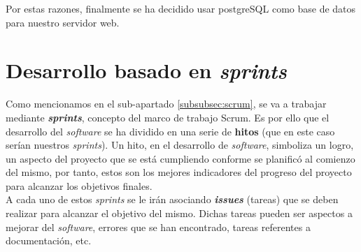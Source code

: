     Por estas razones, finalmente se ha decidido usar postgreSQL como base de datos para
    nuestro servidor web.

\section{Desarrollo basado en \textit{sprints}} \label{sec:sprints}
Como mencionamos en el sub-apartado \ref{subsubsec:scrum}, se va a trabajar mediante
\textbf{\textit{sprints}}, concepto del marco de trabajo Scrum. Es por ello que el desarrollo del
\textit{software} se ha dividido en una serie de \textbf{hitos} (que en este caso serían
nuestros \textit{sprints}). Un hito, en el desarrollo de \textit{software}, simboliza un
logro, un aspecto del proyecto que se está cumpliendo conforme se planificó al comienzo del
mismo, por tanto, estos son los mejores indicadores del progreso del proyecto para alcanzar
los objetivos finales.\\

A cada uno de estos \textit{sprints} se le irán asociando \textbf{\textit{issues}} (tareas)
que se deben realizar para alcanzar el objetivo del mismo. Dichas tareas pueden ser aspectos
a mejorar del \textit{software}, errores que se han encontrado, tareas referentes a
documentación, etc.\\

